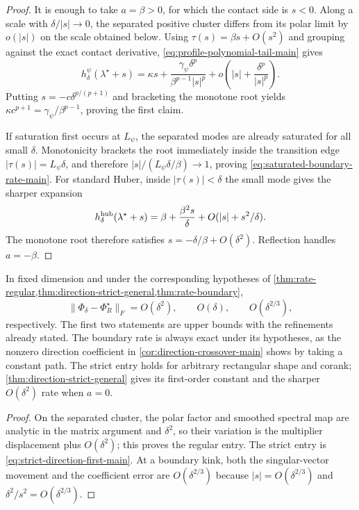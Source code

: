 \begin{proof}
It is enough to take \(a=\beta>0\), for which the contact side is \(s<0\).
Along a scale with \(\delta/|s|\to0\), the separated positive cluster differs
from its polar limit by \(o(|s|)\) on the scale obtained below.  Using
\(\tau(s)=\beta s+O(s^2)\) and grouping against the exact contact derivative,
\eqref{eq:profile-polynomial-tail-main} gives
\[
 h_{\delta}^{\psi}(\lambda^\star+s)
 =\kappa s+
 \frac{\gamma_\psi\delta^p}{\beta^{p-1}|s|^p}
 +o\!\left(|s|+\frac{\delta^p}{|s|^p}\right).
\]
Putting \(s=-c\delta^{p/(p+1)}\) and bracketing the monotone root yields
\(\kappa c^{p+1}=\gamma_\psi/\beta^{p-1}\), proving the first claim.

If saturation first occurs at \(L_\psi\), the separated modes are already
saturated for all small \(\delta\).  Monotonicity brackets the root immediately
inside the transition edge \(|\tau(s)|=L_\psi\delta\), and therefore
\(|s|/(L_\psi\delta/\beta)\to1\), proving
\eqref{eq:saturated-boundary-rate-main}.  For standard Huber, inside
\(|\tau(s)|<\delta\) the small mode gives the sharper expansion
\[
 h_\delta^{\rm hub}(\lambda^\star+s)
 =\beta+\frac{\beta^2s}{\delta}
   +O(|s|+s^2/\delta).
\]
The monotone root therefore satisfies
\(s=-\delta/\beta+O(\delta^2)\).  Reflection handles \(a=-\beta\).
\end{proof}

\begin{corollary}
\label{cor:direction-rates-main}
In fixed dimension and under the corresponding hypotheses of
\cref{thm:rate-regular,thm:direction-strict-general,thm:rate-boundary},
\begin{equation}
 \|\Phi_\delta-\Phi_R^\star\|_F
 =O(\delta^2),\qquad O(\delta),\qquad O(\delta^{2/3}),
 \label{eq:direction-rates-main}
\end{equation}
respectively.  The first two statements are upper bounds with the refinements
already stated.  The boundary rate is always exact under its hypotheses,
as the nonzero direction coefficient in
\cref{cor:direction-crossover-main} shows by taking a constant path.
The strict entry holds for arbitrary
rectangular shape and corank; \cref{thm:direction-strict-general} gives its
first-order constant and the sharper \(O(\delta^2)\) rate when \(a=0\).
\end{corollary}

\begin{proof}
On the separated cluster, the polar factor and smoothed spectral map are
analytic in the matrix argument and \(\delta^2\), so their variation is the
multiplier displacement plus \(O(\delta^2)\); this proves the regular entry.
The strict entry is \eqref{eq:strict-direction-first-main}.  At a boundary
kink, both the singular-vector movement and the coefficient
error are \(O(\delta^{2/3})\) because
\(|s|=O(\delta^{2/3})\) and
\(\delta^2/s^2=O(\delta^{2/3})\).
\end{proof}

